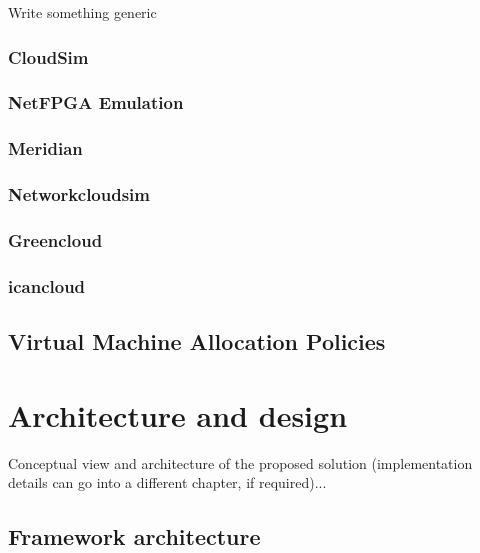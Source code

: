 \documentclass[12pt,english]{book}
\begin{document}
Write something generic

\subsection{CloudSim}

\subsection{NetFPGA Emulation}

\subsection{Meridian}

\subsection{Networkcloudsim}

\subsection{Greencloud}

\subsection{icancloud}

\newpage
\section{Virtual Machine Allocation Policies}

\newpage



\chapter{Architecture and design \label{cha:arqdes} }

Conceptual view and architecture of the proposed solution (implementation details can go into a different chapter, if required)...

\section{Framework architecture}
\end{document}
